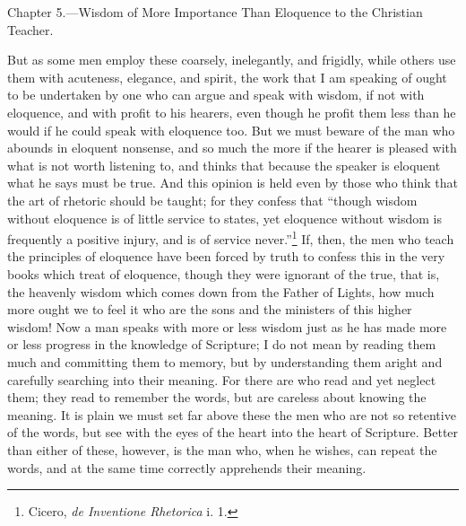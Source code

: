 
Chapter 5.—Wisdom of More Importance Than Eloquence to the Christian Teacher.

But as some men employ these coarsely, inelegantly, and frigidly, while others use them with acuteness, elegance, and spirit, the work that I am speaking of ought to be undertaken by one who can argue and speak with wisdom, if not with eloquence, and with profit to his hearers, even though he profit them less than he would if he could speak with eloquence too. But we must beware of the man who abounds in eloquent nonsense, and so much the more if the hearer is pleased with what is not worth listening to, and thinks that because the speaker is eloquent what he says must be true. And this opinion is held even by those who think that the art of rhetoric should be taught; for they confess that “though wisdom without eloquence is of little service to states, yet eloquence without wisdom is frequently a positive injury, and is of service never.”\footnote{Cicero, \emph{de Inventione Rhetorica} i. 1.} If, then, the men who teach the principles of eloquence have been forced by truth to confess this in the very books which treat of eloquence, though they were ignorant of the true, that is, the heavenly wisdom which comes down from the Father of Lights, how much more ought we to feel it who are the sons and the ministers of this higher wisdom! Now a man speaks with more or less wisdom just as he has made more or less progress in the knowledge of Scripture; I do not mean by reading them much and committing them to memory, but by understanding them aright and carefully searching into their meaning. For there are who read and yet neglect them; they read to remember the words, but are careless about knowing the meaning. It is plain we must set far above these the men who are not so retentive of the words, but see with the eyes of the heart into the heart of Scripture. Better than either of these, however, is the man who, when he wishes, can repeat the words, and at the same time correctly apprehends their meaning.

